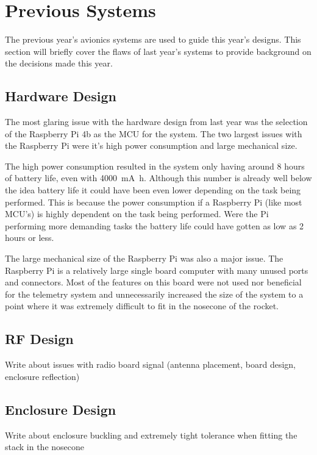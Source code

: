 \section{Previous Systems}

The previous year's avionics systems are used to guide this year's designs. This section will briefly cover the flaws of last year's systems to provide background on the decisions made this year.

\subsection{Hardware Design}

The most glaring issue with the hardware design from last year was the selection of the Raspberry Pi 4b as the MCU for the system. The two largest issues with the Raspberry Pi were it's high power consumption and large mechanical size. 

The high power consumption resulted in the system only having around 8 hours of battery life, even with \qty{4000}{\milli\ampere\hour}. Although this number is already well below the idea battery life it could have been even lower depending on the task being performed. This is because the power consumption if a Raspberry Pi (like most MCU's) is highly dependent on the task being performed. Were the Pi performing more demanding tasks the battery life could have gotten as low as 2 hours or less.

The large mechanical size of the Raspberry Pi was also a major issue. The Raspberry Pi is a relatively large single board computer with many unused ports and connectors. Most of the features on this board were not used nor beneficial for the telemetry system and unnecessarily increased the size of the system to a point where it was extremely difficult to fit in the nosecone of the rocket.



\subsection{RF Design}
Write about issues with radio board signal (antenna placement, board design, enclosure reflection)

\subsection{Enclosure Design}
Write about enclosure buckling and extremely tight tolerance when fitting the stack in the nosecone

